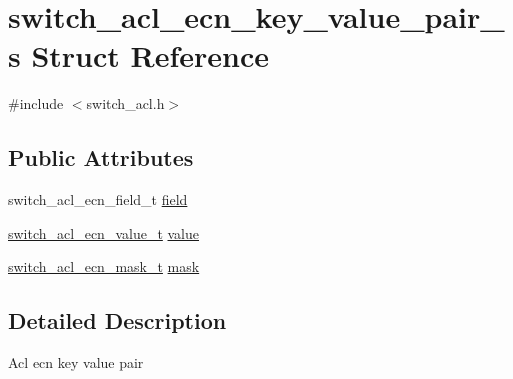 \hypertarget{structswitch__acl__ecn__key__value__pair__s}{\section{switch\+\_\+acl\+\_\+ecn\+\_\+key\+\_\+value\+\_\+pair\+\_\+s Struct Reference}
\label{structswitch__acl__ecn__key__value__pair__s}
}


{\ttfamily \#include $<$switch\+\_\+acl.\+h$>$}

\subsection*{Public Attributes}
\begin{DoxyCompactItemize}
\item 
switch\+\_\+acl\+\_\+ecn\+\_\+field\+\_\+t \hyperlink{structswitch__acl__ecn__key__value__pair__s_af33291b2c30e006f127b2aac07257112}{field}
\item 
\hyperlink{unionswitch__acl__ecn__value__s}{switch\+\_\+acl\+\_\+ecn\+\_\+value\+\_\+t} \hyperlink{structswitch__acl__ecn__key__value__pair__s_a16709804093d6335e2015bbc9a0f3084}{value}
\item 
\hyperlink{group__ACL_gadc583e26c5778b4c802be3a206f01a01}{switch\+\_\+acl\+\_\+ecn\+\_\+mask\+\_\+t} \hyperlink{structswitch__acl__ecn__key__value__pair__s_aca9ed04bdcfa010885728826ff92e708}{mask}
\end{DoxyCompactItemize}


\subsection{Detailed Description}
Acl ecn key value pair 

